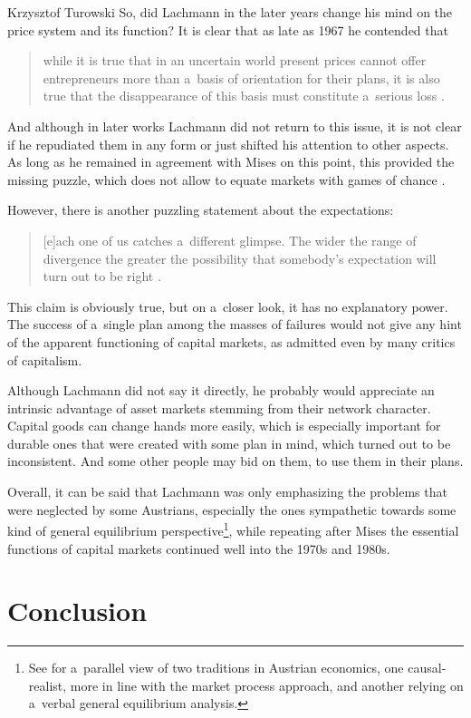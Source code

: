 \begin{artengenv}{Krzysztof Turowski}
So, did Lachmann in the later years change his mind on the price system and its function?
It is clear that as late as 1967 he contended that
\begin{quote}
while it is true that in an uncertain world present prices cannot offer entrepreneurs more than a~basis of orientation for their plans, it is also true that the disappearance of this basis must constitute a~serious loss \parencite[300]{lachmann-causes}.
\end{quote}
And although in later works Lachmann did not return to this issue, it is not clear if he repudiated them in any form or just shifted his attention to other aspects.
As long as he remained in agreement with Mises on this point, this provided the missing puzzle, which does not allow to equate markets with games of chance \parencite[221]{manish}.

However, there is another puzzling statement about the expectations:
\begin{quote}
[e]ach one of us catches a~different glimpse. The wider the range of divergence the greater the possibility that somebody's expectation will turn out to be right \parencite[59]{lachmann-kaleidic}.
\end{quote}
This claim is obviously true, but on a~closer look, it has no explanatory power. The success of a~single plan among the masses of failures would not give any hint of the apparent functioning of capital markets, as admitted even by many critics of capitalism.

Although Lachmann did not say it directly, he probably would appreciate an intrinsic advantage of asset markets stemming from their network character. Capital goods can change hands more easily, which is especially important for durable ones that were created with some plan in mind, which turned out to be inconsistent. And some other people may bid on them, to use them in their plans.

Overall, it can be said that Lachmann was only emphasizing the problems that were neglected by some Austrians, especially the ones sympathetic towards some kind of general equilibrium perspective\footnote{See \textcite{salerno-place,salerno-wieser} for a~parallel view of two traditions in Austrian economics, one causal-realist, more in line with the market process approach, and another relying on a~verbal general equilibrium analysis.}, while repeating after Mises the essential functions of capital markets continued well into the 1970s and 1980s.

\section{Conclusion}


\end{artengenv}
